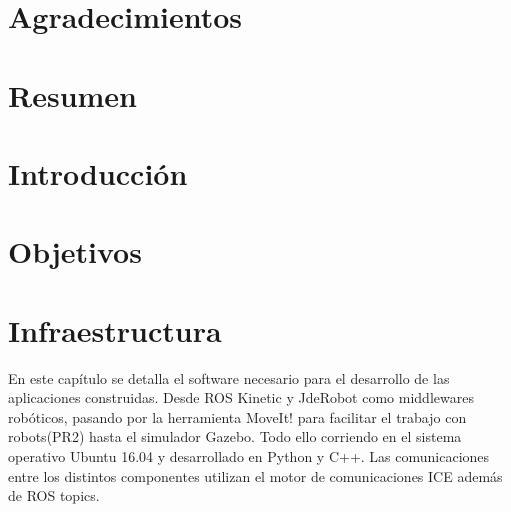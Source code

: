 \documentclass[12pt,spanish,chapterprefix, numbers=noenddot]{book}
\numberwithin{equation}{section}
\numberwithin{figure}{section}
\begin{document}
\chapter*{Agradecimientos}

\chapter*{Resumen}

\mainmatter

\chapter{Introducción}
\section{}
\section{}
\subsection{}
\subsection{}

\chapter{Objetivos}
\section{}

\chapter{Infraestructura}
En este capítulo se detalla el software necesario para el desarrollo de las aplicaciones construidas. Desde ROS Kinetic y JdeRobot como middlewares robóticos, pasando por la herramienta MoveIt! para facilitar el trabajo con robots(PR2) hasta el simulador Gazebo. Todo ello corriendo en el sistema operativo Ubuntu 16.04 y desarrollado en Python y C++.  Las comunicaciones entre los distintos componentes utilizan el motor de comunicaciones ICE además de ROS topics. 
\end{document}
